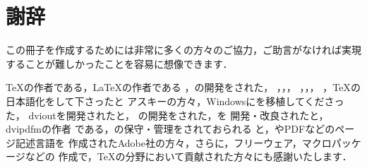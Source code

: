 ﻿%
\chapter{謝辞}

この冊子を作成するためには非常に多くの方々のご協力，ご助言がなければ実現
することが難しかったことを容易に想像できます．

{\TeX}の作者である，{\LaTeX}の作者である
，{\LaTeXe}の開発をされた，
，，，
，，，
，{\TeX}の日本語化をして下さったと
アスキーの方々，Windowsに{\pTeX}を移植してくださった，
dvioutを開発されたと，
\prog{\BibTeX}の開発をされた，を
開発・改良されたと，dvipdfmの作者
である，{\dvipdfmx}の保守・管理をされておられる
と，{\PS}やPDFなどのページ記述言語を
作成されたAdobe社の方々，さらに，フリーウェア，マクロパッケージなどの
作成で，{\TeX}の分野において貢献された方々にも感謝いたします．


